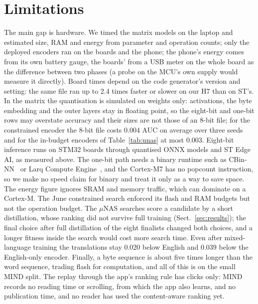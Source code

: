 \documentclass{llncs}
\begin{document}
\section{Limitations}
The main gap is hardware. We timed the matrix models on the laptop and estimated
size, RAM and energy from parameter and operation counts; only the deployed
encoders ran on the boards and the phone; the phone's energy comes from its own
battery gauge, the boards' from a USB meter on the whole board as the difference
between two phases (a probe on the MCU's own supply would measure it directly).
Board times depend on the code generator's version and setting: the same file
ran up to 2.4 times faster or slower on our H7 than on ST's. In the matrix the
quantisation is simulated on weights only: activations, the byte embedding and the
outer layers stay in floating point, so the eight-bit and one-bit rows may
overstate accuracy and their sizes are not those of an 8-bit file; for the
constrained encoder the 8-bit file costs 0.004 AUC on average over three seeds and for the
in-budget encoders of Table~\ref{tab:unas} at most 0.003. Eight-bit inference
runs on STM32 boards through
quantised ONNX models and ST Edge AI, as measured above. The one-bit path needs a
binary runtime such as CBin-NN~\cite{sakr2024cbinnn} or Larq Compute
Engine~\cite{bannink2021lce}, and the Cortex-M7 has no popcount instruction, so we
make no speed claim for binary and treat it only as a way to save space. The
energy figure ignores SRAM and memory traffic, which can dominate on a Cortex-M.
The June constrained search enforced its flash and RAM budgets but not the
operation budget. The $\mu$NAS searches score a
candidate by a short distillation, whose ranking did not survive full training
(Sect.~\ref{sec:results}); the final choice after full distillation of the eight
finalists changed both choices, and a longer fitness inside the search would
cost more search time. Even after mixed-language
training the translations stay 0.020 below English and 0.039 below the
English-only encoder. Finally, a byte sequence is about five times longer than the word
sequence, trading flash for computation, and all of this is on the small MIND
split. The replay through the app's ranking rule has clicks only: MIND records
no reading time or scrolling, from which the app also learns, and no
publication time, and no reader has used the content-aware ranking yet.
\end{document}
